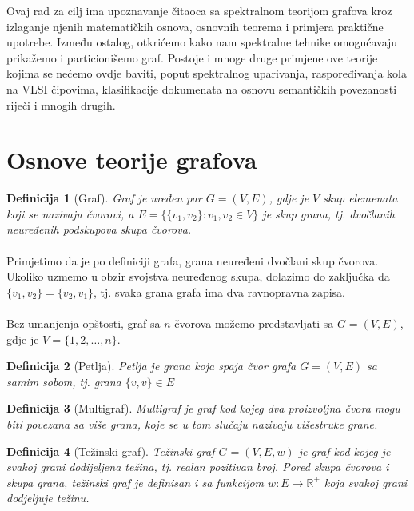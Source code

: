 \documentclass[11pt]{article}
\newtheorem{definition}{Definicija}
\begin{document}
	Ovaj rad za cilj ima upoznavanje čitaoca sa spektralnom teorijom grafova kroz izlaganje njenih matematičkih osnova, osnovnih teorema i primjera praktične upotrebe.
	Između ostalog, otkrićemo kako nam spektralne tehnike omogućavaju prikažemo i particionišemo graf. Postoje i mnoge druge primjene ove teorije kojima se nećemo ovdje baviti, poput 
	spektralnog uparivanja, raspoređivanja kola na VLSI čipovima, klasifikacije dokumenata na osnovu semantičkih povezanosti riječi i mnogih drugih.
	
	\section{Osnove teorije grafova}
	
		\begin{definition}[Graf]
		Graf je uređen par $G = (V, E)$, gdje je $V$ skup elemenata koji se nazivaju čvorovi, a $E = \{ \{v_1, v_2\} : v_1, v_2 \in V \}$ je skup grana, tj. dvočlanih neuređenih podskupova skupa čvorova.
		\end{definition}
	
        \paragraph{}
        Primjetimo da je po definiciji grafa, grana neuređeni dvočlani skup čvorova. Ukoliko uzmemo u obzir svojstva neuređenog skupa, dolazimo do zaključka da $\{v_1,v_2\} = \{v_2, v_1\}$, tj. svaka grana grafa ima dva ravnopravna zapisa.
    
        \paragraph{}
        Bez umanjenja opštosti, graf sa $n$ čvorova možemo predstavljati sa $G = (V, E)$, gdje je $V = \{1, 2, \dots, n\}$.
	
		\begin{definition}[Petlja]
		Petlja je grana koja spaja čvor grafa $G=(V,E)$ sa samim sobom, tj. grana $\{v,v\} \in E$
		\end{definition}
	
		\begin{definition}[Multigraf]
		Multigraf je graf kod kojeg dva proizvoljna čvora mogu biti povezana sa više grana, koje se u tom slučaju nazivaju višestruke grane.
		\end{definition}
	
		\begin{definition}[Težinski graf]
		Težinski graf $G =(V,E,w)$ je graf kod kojeg je svakoj grani dodijeljena težina, tj. realan pozitivan broj. Pored skupa čvorova i skupa grana, težinski graf je definisan i sa funkcijom $w: E \to \mathbb{R}^+$ koja svakoj grani dodjeljuje težinu.
		\end{definition}
	
\end{document}
